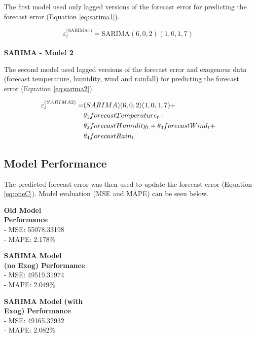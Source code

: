 \documentclass[mstat,12pt]{unswthesis}
\begin{document}
The first model used only lagged versions of the forecast error for predicting the forecast error (Equation \eqref{eq:sarima1}).

\begin{equation}
\varepsilon^{\text{(SARIMA1)}}_{t} = \text{SARIMA}(6,0,2)(1,0,1,7)
\label{eq:sarima1}
\end{equation}\\
\noindent \textbf{SARIMA - Model 2}

\bigskip

The second model used lagged versions of the forecast error and exogenous data (forecast temperature, humidity, wind and rainfall) for predicting the forecast error (Equation \eqref{eq:sarima2}).

\begin{equation}
\begin{split}
\varepsilon^{\text(SARIMA2)}_t =& \text(SARIMA)(6,0,2)(1,0,1,7) + \\
& \theta_{1}forecastTemperature_t + \\
& \theta_{2}forecastHumidity_t + \theta_{3}forecastWind_t + \\
& \theta_{4}forecastRain_t
\end{split}
\label{eq:sarima2}
\end{equation}

\subsection{Model Performance}\label{model-performance-1}

The predicted forecast error was then used to update the forecast error (Equation \eqref{eq:oneC}). Model evaluation (MSE and MAPE) can be seen below.

\begin{multicols}{3}
\noindent\textbf{Old Model}\\
\textbf{Performance}\\
- MSE: 55078.33198 \\
- MAPE: 2.178\% \\


\columnbreak


\noindent\textbf{SARIMA Model} \\
\textbf{(no Exog) Performance} \\
- MSE: 49519.31974\\
- MAPE: 2.049\%\\

\columnbreak


\noindent\textbf{SARIMA Model (with} \\ 
\textbf{Exog) Performance} \\
- MSE: 49165.32932 \\
- MAPE: 2.082\% \\
\end{multicols}
\end{document}
